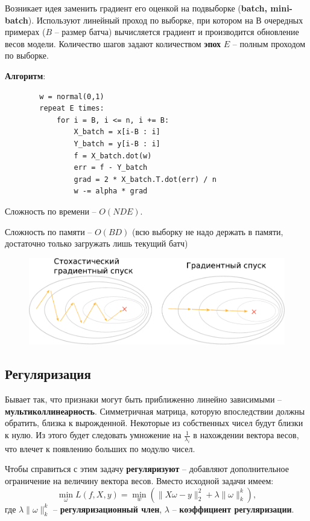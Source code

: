 \documentclass[a4paper, 10pt, openany]{book} %
\begin{document}
 	Возникает идея заменить градиент его оценкой на подвыборке (\textbf{batch, mini-batch}). Используют линейный проход по выборке, при котором на $В$ очередных примерах ($B$ -- размер батча) вычисляется градиент и производится обновление весов модели. Количество шагов задают количеством \textbf{эпох} $E$ -- полным проходом по выборке.
 	
 	\textbf{Алгоритм}:
    \begin{lstlisting}
    	w = normal(0,1)
    	repeat E times:
    		for i = B, i <= n, i += B:
    			X_batch = x[i-B : i]
    			Y_batch = y[i-B : i]
     			f = X_batch.dot(w)
     			err = f - Y_batch
     			grad = 2 * X_batch.T.dot(err) / n
     			w -= alpha * grad
 	\end{lstlisting}
 	
 	Сложность по времени -- $O(NDE)$.
 	
 	Сложность по памяти -- $O(BD)$ (всю выборку не надо держать в памяти, достаточно только загружать лишь текущий батч)
 	
 	\newpage
 	
 	\begin{figure}[h!]
 		\centering
 		\includegraphics[width=\linewidth]{pictures/linear_models/SGD_GD.pdf}
 	\end{figure}
 
 	\subsection{Регуляризация}
 	
 	Бывает так, что признаки могут быть приближенно линейно зависимыми -- \textbf{мультиколлинеарность}. Симметричная матрица, которую впоследствии должны обратить, близка к вырожденной. Некоторые из собственных чисел будут близки к нулю. Из этого будет следовать умножение на $\frac{1}{\lambda_i}$ в нахождении вектора весов, что влечет к появлению больших по модулю чисел.
 	
 	Чтобы справиться с этим задачу \textbf{регуляризуют} -- добавляют дополнительное ограничение на величину вектора весов. Вместо исходной задачи имеем:
 	\begin{equation*}
 		\min_\omega L(f,X,y) = \min_w (\|X\omega-y\|^2_2 + \lambda \|\omega\|^k_k),
 	\end{equation*}
 	где $\lambda \|\omega\|^k_k$ -- \textbf{регуляризационный член}, $\lambda$ -- \textbf{коэффициент регуляризации}.
 	
\end{document}
